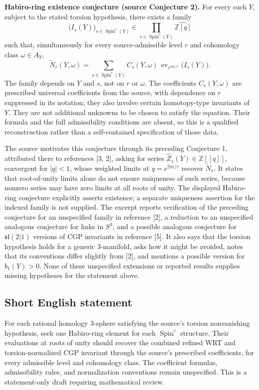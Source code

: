 \documentclass[11pt]{article}
\newcommand{\Z}{\mathbb{Z}}
\begin{document}
\textbf{Habiro-ring existence conjecture (source Conjecture 2).} For every such \(Y\), subject to the stated torsion hypothesis, there exists a family
\[
\bigl(I_s(Y)\bigr)_{s\in\operatorname{Spin}^c(Y)}\in
\prod_{s\in\operatorname{Spin}^c(Y)}\widehat{\Z[q]}
\]
such that, simultaneously for every source-admissible level \(r\) and cohomology class \(\omega\in A_Y\),
\[
\widetilde N_r(Y,\omega)=
\sum_{s\in\operatorname{Spin}^c(Y)}
C_s(Y,\omega)\,
\operatorname{ev}_{e^{2\pi i/r}}\bigl(I_s(Y)\bigr).
\]
The family depends on \(Y\) and \(s\), not on \(r\) or \(\omega\). The coefficients \(C_s(Y,\omega)\) are prescribed universal coefficients from the source, with dependence on \(r\) suppressed in its notation; they also involve certain homotopy-type invariants of \(Y\). They are not additional unknowns to be chosen to satisfy the equation. Their formula and the full admissibility conditions are absent, so this is a qualified reconstruction rather than a self-contained specification of those data.

The source motivates this conjecture through its preceding Conjecture 1, attributed there to references [3, 2], asking for series \(\widehat Z_s(Y)\in\Z[[q]]\), convergent for \(|q|<1\), whose weighted limits at \(q=e^{2\pi i/r}\) recover \(\widetilde N_r\). It states that root-of-unity limits alone do not ensure uniqueness of such series, because nonzero series may have zero limits at all roots of unity. The displayed Habiro-ring conjecture explicitly asserts existence; a separate uniqueness assertion for the indexed family is not supplied. The excerpt reports verification of the preceding conjecture for an unspecified family in reference [2], a reduction to an unspecified analogous conjecture for links in \(S^3\), and a possible analogous conjecture for \(\mathfrak{sl}(2|1)\) versions of CGP invariants in reference [5]. It also says that the torsion hypothesis holds for a generic \(3\)-manifold, asks how it might be avoided, notes that its conventions differ slightly from [2], and mentions a possible version for \(b_1(Y)>0\). None of these unspecified extensions or reported results supplies missing hypotheses for the statement above.
\subsection{Short English statement}
For each rational homology \(3\)-sphere satisfying the source's torsion nonvanishing hypothesis, seek one Habiro-ring element for each \(\operatorname{Spin}^c\) structure. Their evaluations at roots of unity should recover the combined refined WRT and torsion-normalized CGP invariant through the source's prescribed coefficients, for every admissible level and cohomology class. The coefficient formulas, admissibility rules, and normalization conventions remain unspecified. This is a statement-only draft requiring mathematical review.
\end{document}
